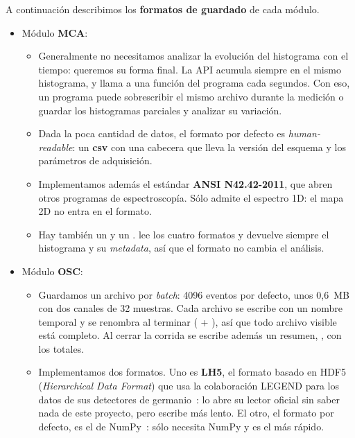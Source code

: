 A continuación describimos los \textbf{formatos de guardado} de cada módulo.
\begin{itemize}
  \item Módulo \textbf{MCA}:
  \begin{itemize}
    \item Generalmente no necesitamos analizar la evolución del histograma con
      el tiempo: queremos su forma final. La API acumula siempre en el mismo
      histograma, y  llama a una función del
      programa cada  segundos. Con eso, un programa puede
      sobrescribir el mismo archivo durante la medición o guardar los
      histogramas parciales y analizar su variación.
    \item Dada la poca cantidad de datos, el formato por defecto es
      \emph{human-readable}: un \textbf{csv} con una cabecera
       que lleva la versión del esquema y los parámetros
      de adquisición.
    \item Implementamos además el estándar \textbf{ANSI N42.42-2011}, que abren
      otros programas de espectroscopía. Sólo admite el espectro 1D: el mapa 2D
      no entra en el formato.
    \item Hay también un  y un . 
      lee los cuatro formatos y devuelve siempre el histograma y su \emph{metadata},
      así que el formato no cambia el análisis.
  \end{itemize}
  \item Módulo \textbf{OSC}:
  \begin{itemize}
    \item Guardamos un archivo por \emph{batch}: 4096 eventos por defecto, unos
      0,6~MB con dos canales de 32 muestras. Cada archivo se escribe con un
      nombre temporal y se renombra al terminar ( +
      ), así que todo archivo visible está completo. Al
      cerrar la corrida se escribe además un resumen,
      , con los totales.
    \item Implementamos dos formatos. Uno es \textbf{LH5}, el formato basado en
      HDF5 (\emph{Hierarchical Data Format}) que usa la colaboración LEGEND
      para los datos de sus detectores de germanio~\cite{LEGENDHDF5}: lo abre
      su lector oficial sin saber nada de este proyecto, pero escribe más lento.
      El otro, el formato por defecto, es el  de
      NumPy~\cite{NumpyNEP1}: sólo necesita NumPy y es el más rápido.
  \end{itemize}
\end{itemize}

